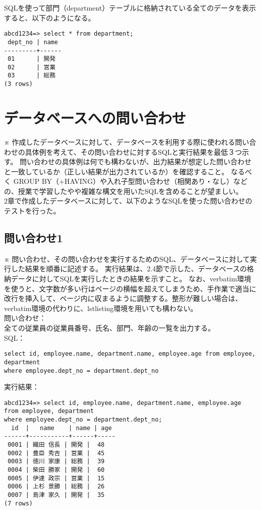\documentclass[a4j,12pt]{jreport}
\begin{document}
SQLを使って部門（department）テーブルに格納されている全てのデータを表示すると、以下のようになる。

\begin{verbatim}
abcd1234=> select * from department;
 dept_no | name 
---------+------
 01      | 開発
 02      | 営業
 03      | 総務
(3 rows)
\end{verbatim}
\vspace{3mm}


\chapter{データベースへの問い合わせ}

※ 作成したデータベースに対して、データベースを利用する際に使われる問い合わせの具体例を考えて、その問い合わせに対するSQLと実行結果を最低３つ示す。
問い合わせの具体例は何でも構わないが、出力結果が想定した問い合わせと一致しているか（正しい結果が出力されているか）を確認すること。
なるべく GROUP BY（+HAVING）や入れ子型問い合わせ（相関あり・なし）などの、授業で学習したやや複雑な構文を用いたSQLを含めることが望ましい。\\

2章で作成したデータベースに対して、以下のようなSQLを使った問い合わせのテストを行った。

\section{問い合わせ1}

※ 問い合わせ、その問い合わせを実行するためのSQL、データベースに対して実行した結果を順番に記述する。
実行結果は、2.4節で示した、データベースの格納データに対してSQLを実行したときの結果を示すこと。
なお、verbatim環境を使うと、文字数が多い行はページの横幅を超えてしまうため、手作業で適当に改行を挿入して、ページ内に収まるように調整する。整形が難しい場合は、verbatim環境の代わりに、lstlisting環境を用いても構わない。\\

問い合わせ：\\
全ての従業員の従業員番号、氏名、部門、年齢の一覧を出力する。\\

SQL：
\begin{verbatim}
select id, employee.name, department.name, employee.age from employee, department 
where employee.dept_no = department.dept_no
\end{verbatim}
\vspace{3mm}

実行結果：
\begin{verbatim}
abcd1234=> select id, employee.name, department.name, employee.age from employee, department 
where employee.dept_no = department.dept_no;
  id  |   name    | name | age 
------+-----------+------+-----
 0001 | 織田 信長 | 開発 |  48
 0002 | 豊臣 秀吉 | 営業 |  45
 0003 | 徳川 家康 | 総務 |  39
 0004 | 柴田 勝家 | 開発 |  60
 0005 | 伊達 政宗 | 営業 |  15
 0006 | 上杉 景勝 | 総務 |  26
 0007 | 島津 家久 | 開発 |  35
(7 rows)
\end{verbatim}
\end{document}

